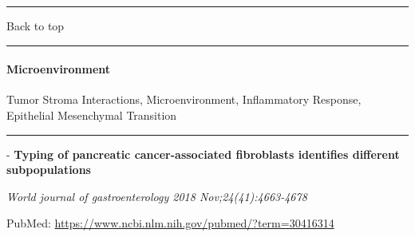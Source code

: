 \documentclass[]{article}
\let\oldparagraph\paragraph
\renewcommand{\paragraph}[1]{\oldparagraph{#1}\mbox{}}
\begin{document}
\begin{center}\rule{0.5\linewidth}{\linethickness}\end{center}

Back to top

\begin{center}\rule{0.5\linewidth}{\linethickness}\end{center}

\pagebreak

\hypertarget{microenvironment}{%
\paragraph{Microenvironment}\label{microenvironment}}

Tumor Stroma Interactions, Microenvironment, Inflammatory Response,
Epithelial Mesenchymal Transition

\begin{center}\rule{0.5\linewidth}{\linethickness}\end{center}

 - \textbf{Typing of pancreatic cancer-associated fibroblasts identifies
different subpopulations}

\emph{World journal of gastroenterology 2018 Nov;24(41):4663-4678}

PubMed: \url{https://www.ncbi.nlm.nih.gov/pubmed/?term=30416314}
\end{document}
